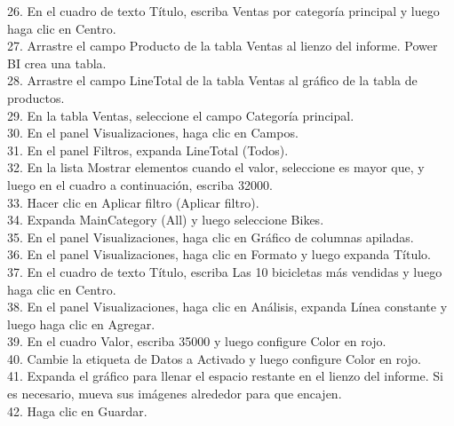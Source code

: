 \begin{flushleft}
\begin{itemize}
26. En el cuadro de texto Título, escriba Ventas por categoría principal y luego haga clic en Centro.\\
27. Arrastre el campo Producto de la tabla Ventas al lienzo del informe. Power BI crea una tabla.\\
28. Arrastre el campo LineTotal de la tabla Ventas al gráfico de la tabla de productos.\\
29. En la tabla Ventas, seleccione el campo Categoría principal.\\
30. En el panel Visualizaciones, haga clic en Campos.\\
31. En el panel Filtros, expanda LineTotal (Todos).\\
32. En la lista Mostrar elementos cuando el valor, seleccione es mayor que, y luego en el cuadro a continuación, escriba 32000.\\
33. Hacer clic en Aplicar filtro (Aplicar filtro).\\
34. Expanda MainCategory (All) y luego seleccione Bikes.\\
35. En el panel Visualizaciones, haga clic en Gráfico de columnas apiladas.\\
36. En el panel Visualizaciones, haga clic en Formato y luego expanda Título.\\
37. En el cuadro de texto Título, escriba Las 10 bicicletas más vendidas y luego haga clic en Centro.\\
38. En el panel Visualizaciones, haga clic en Análisis, expanda Línea constante y luego haga clic en Agregar.\\
39. En el cuadro Valor, escriba 35000 y luego configure Color en rojo.\\
40. Cambie la etiqueta de Datos a Activado y luego configure Color en rojo.\\
41. Expanda el gráfico para llenar el espacio restante en el lienzo del informe. Si es necesario, mueva sus imágenes
alrededor para que encajen.\\
42. Haga clic en Guardar.\\


\end{itemize}
\end{flushleft}
